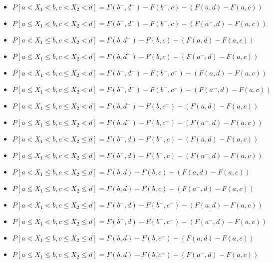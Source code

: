 \documentclass[12pt]{article}
\begin{document}
\begin{enumerate}
\begin{itemize}
\item $P[a<X_1<b,c<X_2<d]=F(b^-,d^-)-F(b^-,c)-(F(a,d)-F(a,c))$
\item $P[a\leq X_1<b,c<X_2<d]=F(b^-,d^-)-F(b^-,c)-(F(a^-,d)-F(a,c))$
\item $P[a<X_1\leq b,c<X_2<d]=F(b,d^-)-F(b,c)-(F(a,d)-F(a,c))$
\item $P[a\leq X_1\leq b,c<X_2<d]=F(b,d^-)-F(b,c)-(F(a^-,d)-F(a,c))$
\item $P[a<X_1<b,c\leq X_2<d]=F(b^-,d^-)-F(b^-,c^-)-(F(a,d)-F(a,c))$
\item $P[a\leq X_1<b,c\leq X_2<d]=F(b^-,d^-)-F(b^-,c^-)-(F(a^-,d)-F(a,c))$
\item $P[a<X_1\leq b,c\leq X_2<d]=F(b,d^-)-F(b,c^-)-(F(a,d)-F(a,c))$
\item $P[a\leq X_1\leq b,c\leq X_2<d]=F(b,d^-)-F(b,c^-)-(F(a^-,d)-F(a,c))$
\item $P[a<X_1<b,c<X_2\leq d]=F(b^-,d)-F(b^-,c)-(F(a,d)-F(a,c))$
\item $P[a\leq X_1<b,c<X_2\leq d]=F(b^-,d)-F(b^-,c)-(F(a^-,d)-F(a,c))$
\item $P[a<X_1\leq b,c<X_2\leq d]=F(b,d)-F(b,c)-(F(a,d)-F(a,c))$
\item $P[a\leq X_1\leq b,c<X_2\leq d]=F(b,d)-F(b,c)-(F(a^-,d)-F(a,c))$
\item $P[a<X_1<b,c\leq X_2\leq d]=F(b^-,d)-F(b^-,c^-)-(F(a,d)-F(a,c))$
\item $P[a\leq X_1<b,c\leq X_2\leq d]=F(b^-,d)-F(b^-,c^-)-(F(a^-,d)-F(a,c))$
\item $P[a<X_1\leq b,c\leq X_2\leq d]=F(b,d)-F(b,c^-)-(F(a,d)-F(a,c))$
\item $P[a\leq X_1\leq b,c\leq X_2\leq d]=F(b,d)-F(b,c^-)-(F(a^-,d)-F(a,c))$

\end{itemize}

\end{enumerate}
\end{document}
